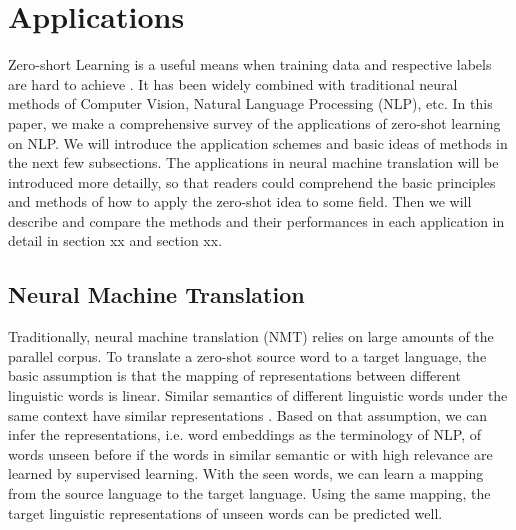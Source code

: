 \documentclass[sigconf, review]{acmart}
\begin{document}
  


\maketitle

\section{Applications}
Zero-short Learning is a useful means when training data and respective labels are hard to achieve \cite{wang2019survey}. It has been widely combined with traditional neural methods of Computer Vision, Natural Language Processing (NLP), etc. In this paper, we make a comprehensive survey of the applications of zero-shot learning on NLP. We will introduce the application schemes and basic ideas of methods in the next few subsections. The applications in neural machine translation will be introduced more detailly, so that readers could comprehend the basic principles and methods of how to apply the zero-shot idea to some field. Then we will describe and compare the methods and their performances in each application in detail in section xx and section xx. 

\subsection{Neural Machine Translation}

Traditionally, neural machine translation (NMT) relies on large amounts of the parallel corpus. To translate a zero-shot source word to a target language, the basic assumption is that the mapping of representations between different linguistic words is linear. Similar semantics of different linguistic words under the same context have similar representations \cite{mikolov2013exploiting}. Based on that assumption, we can infer the representations, i.e. word embeddings as the terminology of NLP, of words unseen before if the words in similar semantic or with high relevance are learned by supervised learning. With the seen words, we can learn a mapping from the source language to the target language. Using the same mapping, the target linguistic representations of unseen words can be predicted well. 
\end{document}
